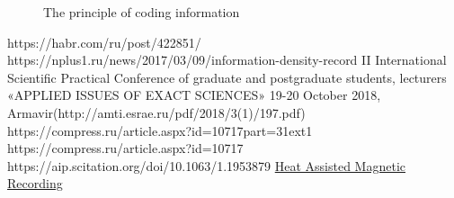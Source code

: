 \documentclass{beamer}
\begin{document}
  \begin{frame}
  \begin{figure}[h]
  \label{ris9}
  \end{figure}
  \end{frame}
  \begin{frame} 
  \begin{figure}[h!]
  \caption{The principle of coding information}

  \end{figure}
  \end{frame}
  \begin{frame}
  \begin{thebibliography}{9}
   https://habr.com/ru/post/422851/
   https://nplus1.ru/news/2017/03/09/information-density-record
   II International Scientific Practical Conference of graduate and postgraduate students,
  lecturers «APPLIED ISSUES OF EXACT SCIENCES»
  19-20 October 2018, Armavir(http://amti.esrae.ru/pdf/2018/3(1)/197.pdf)
   https://compress.ru/article.aspx?id=10717part=31ext1
   https://compress.ru/article.aspx?id=10717
   https://aip.scitation.org/doi/10.1063/1.1953879
   \href{https://www.researchgate.net/publication/224354512_Heat_Assisted_Magnetic_Recording}{Heat Assisted Magnetic Recording}

  \end{thebibliography}
  \end{frame}
\end{document}
